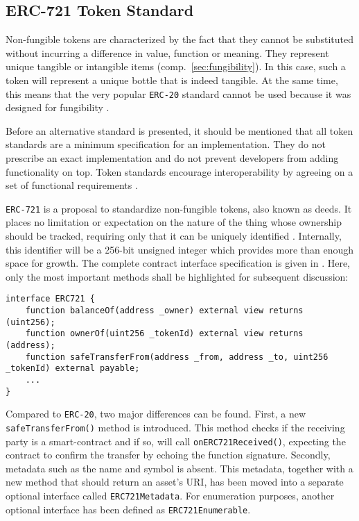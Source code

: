\subsection{ERC-721 Token Standard}
Non-fungible tokens are characterized by the fact that they cannot be substituted without incurring a difference in value, function or meaning. They represent unique tangible or intangible items (comp.~\ref{sec:fungibility}). In this case, such a token will represent a unique bottle that is indeed tangible. At the same time, this means that the very popular \texttt{\acs{ERC}-20} standard cannot be used because it was designed for fungibility \cite{erc20}. 

Before an alternative standard is presented, it should be mentioned that all token standards are a minimum specification for an implementation. They do not prescribe an exact implementation and do not prevent developers from adding functionality on top. Token standards encourage interoperability by agreeing on a set of functional requirements \cite[pp.~198--199]{Antonopoulos.2018}. 

\texttt{\acs{ERC}-721} is a proposal to standardize non-fungible tokens, also known as deeds. It places no limitation or expectation on the nature of the thing whose ownership should be tracked, requiring only that it can be uniquely identified \cite[p.~197]{Antonopoulos.2018}. Internally, this identifier will be a 256-bit unsigned integer which provides more than enough space for growth. The complete contract interface specification is given in \cite{erc721}. Here, only the most important methods shall be highlighted for subsequent discussion:

\begin{lstlisting}[language=Solidity, caption=ERC-721 contract interface specification, label=lst:erc721]
interface ERC721 {
    function balanceOf(address _owner) external view returns (uint256);
    function ownerOf(uint256 _tokenId) external view returns (address);
    function safeTransferFrom(address _from, address _to, uint256 _tokenId) external payable;
    ...
}
\end{lstlisting}
 
Compared to \texttt{\acs{ERC}-20}, two major differences can be found. First, a new \texttt{safeTransferFrom()} method is introduced. This method checks if the receiving party is a smart-contract and if so, will call \texttt{onERC721Received()}, expecting the contract to confirm the transfer by echoing the function signature. Secondly, metadata such as the name and symbol is absent. This metadata, together with a new method that should return an asset's \acs{URI}, has been moved into a separate optional interface called \texttt{ERC721Metadata}. For enumeration purposes, another optional interface has been defined as  \texttt{ERC721Enumerable}.

